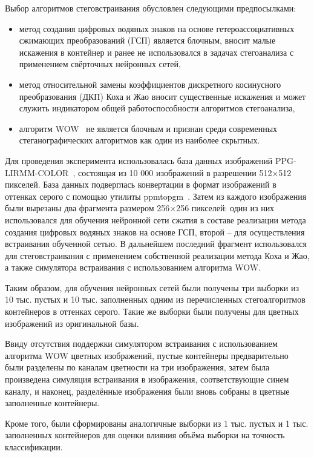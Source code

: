 Выбор алгоритмов стеговстраивания обусловлен следующими предпосылками:
\begin{itemize}
\item метод создания цифровых водяных знаков на основе гетероассоциативных сжимающих преобразований (ГСП) является блочным, вносит малые искажения в контейнер и ранее не использовался в задачах стегоанализа с применением свёрточных нейронных сетей,
\item метод относительной замены коэффициентов дискретного косинусного преобразования (ДКП) Коха и Жао вносит существенные искажения и может служить индикатором общей работоспособности алгоритмов стегоанализа,
\item алгоритм WOW~\cite{WOW} не является блочным и признан среди современных стеганографических алгоритмов как один из наиболее скрытных.
\end{itemize}

Для проведения эксперимента использовалась база данных изображений PPG-LIRMM-COLOR~\cite{PPG-LIRMM-COLOR}, состоящая из 10 000 изображений в разрешении 512×512 пикселей. База данных подверглась конвертации в формат изображений в оттенках серого с помощью утилиты ppmtopgm~\cite{ppmtopgm}. Затем из каждого изображения были вырезаны два фрагмента размером 256×256 пикселей: один из них использовался для обучения нейронной сети сжатия в составе реализации метода создания цифровых водяных знаков на основе ГСП, второй – для осуществления встраивания обученной сетью. В дальнейшем последний фрагмент использовался для стеговстраивания с применением собственной реализации метода Коха и Жао, а также симулятора встраивания с использованием алгоритма WOW.

Таким образом, для обучения нейронных сетей были получены три выборки из 10 тыс. пустых и 10 тыс. заполненных одним из перечисленных стегоалгоритмов контейнеров в оттенках серого. Такие же выборки были получены для цветных изображений из оригинальной базы.

Ввиду отсутствия поддержки симулятором встраивания с использованием алгоритма WOW цветных изображений, пустые контейнеры предварительно были разделены по каналам цветности на три изображения, затем была произведена симуляция встраивания в изображения, соответствующие синем каналу, и наконец, разделённые изображения были вновь собраны в цветные заполненные контейнеры.

Кроме того, были сформированы аналогичные выборки из 1 тыс. пустых и 1 тыс. заполненных контейнеров для оценки влияния объёма выборки на точность классификации.

